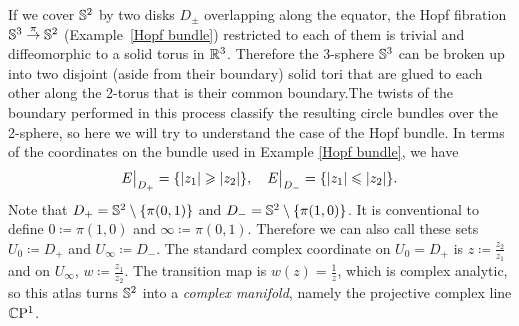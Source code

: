 \begin{example}\label{ex hopf bundle atlas}
    If we cover $\mathbb{S}^2$ by two disks $D_\pm$ overlapping along the equator, the Hopf fibration $\mathbb{S}^3\overset\pi\to \mathbb{S}^2$ (Example~\ref{Hopf bundle}) restricted to each of them is trivial and diffeomorphic to a solid torus in $\mathbb{R}^3$. Therefore the 3-sphere $\mathbb{S}^3$ can be broken up into two disjoint (aside from their boundary) solid tori that are glued to each other along the 2-torus that is their common boundary.The twists of the boundary performed in this process classify the resulting circle bundles over the 2-sphere, so here we will try to understand the case of the Hopf bundle. In terms of the coordinates on the bundle used in Example \ref{Hopf bundle}, we have 
    \[\restr{E}{D_+}=\{|z_1|\geq|z_2|\},\quad \restr{E}{D_-}=\{|z_1|\leq|z_2|\}.\]
    Note that $D_+=\mathbb{S}^2\setminus \{\pi(0,1)\}$ and $D_-=\mathbb{S}^2 \setminus \{\pi(1,0)\}$. It is conventional to define $0\coloneqq \pi(1,0)$ and $\infty\coloneqq \pi(0,1)$. Therefore we can also call these sets $U_0\coloneqq D_+$ and $U_\infty\coloneqq D_-$. The standard complex coordinate on $U_0=D_+$ is $z\coloneqq \frac{z_2}{z_1}$ and on $U_\infty$, $w\coloneqq \frac{z_1}{z_2}$. The transition map is $w(z)=\frac{1}{z}$, which is complex analytic, so this atlas turns $\mathbb{S}^2$ into a \emph{complex manifold}, namely the projective complex line $\mathbb{C}\mathrm{P}^1$.
    

\end{example}
